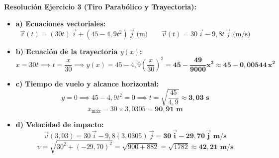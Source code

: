\documentclass[11pt,a4paper]{article}
\begin{document}
\vspace{0.4cm}
\noindent\textbf{Resolución Ejercicio 3 (Tiro Parabólico y Trayectoria):}
\begin{itemize}[leftmargin=1.5em, itemsep=3pt]
    \item \textbf{a) Ecuaciones vectoriales:}
    \[
    \vec{r}(t) = (30t)\,\vec{i} + (45 - 4{,}9t^2)\,\vec{j}\text{ (m)} \qquad \vec{v}(t) = 30\,\vec{i} - 9{,}8t\,\vec{j}\text{ (m/s)}
    \]
    \item \textbf{b) Ecuación de la trayectoria $y(x)$:}
    \[
    x = 30t \implies t = \frac{x}{30} \implies y(x) = 45 - 4{,}9\left(\frac{x}{30}\right)^2 = \mathbf{45 - \frac{49}{9000}x^2 \approx 45 - 0{,}00544\,x^2}
    \]
    \item \textbf{c) Tiempo de vuelo y alcance horizontal:}
    \[
    y = 0 \implies 45 - 4{,}9t^2 = 0 \implies t = \sqrt{\frac{45}{4{,}9}} \approx \mathbf{3{,}03\text{ s}}
    \]
    \[
    x_{\text{máx}} = 30 \times 3{,}0305 = \mathbf{90{,}91\text{ m}}
    \]
    \item \textbf{d) Velocidad de impacto:}
    \[
    \vec{v}(3{,}03) = 30\,\vec{i} - 9{,}8(3{,}0305)\,\vec{j} = \mathbf{30\,\vec{i} - 29{,}70\,\vec{j}\text{ m/s}}
    \]
    \[
    v = \sqrt{30^2 + (-29{,}70)^2} = \sqrt{900 + 882} = \sqrt{1782} \approx \mathbf{42{,}21\text{ m/s}}
    \]
\end{itemize}

\newpage
\end{document}
